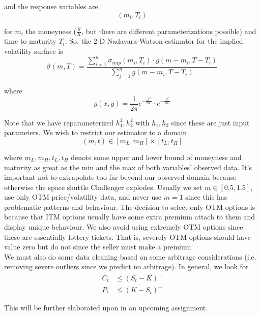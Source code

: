 \documentclass[12pt]{article}
\newlength\tindent
\renewcommand{\indent}{\hspace*{\tindent}}
\begin{document}
and the response variables are
\begin{equation*}
	(m_i,T_i)
\end{equation*}

for $m_i$ the moneyness ($\frac{S}{K}$, but there are different parameterizations possible) and time to maturity $T_i$. So, the 2-D Nadayara-Watson estimator for the implied volatility surface is
\begin{equation*}
	\hat{\sigma}(m,T) = \frac{\sum_{i=1}^n\sigma_{imp}(m_i,T_i)\cdot g(m - m_i, T - T_i)}{\sum_{j = 1}^n g(m - m_i, T - T_i)}
\end{equation*}

where 
\begin{equation*}
	g(x,y) = \frac{1}{2\pi}e^{-\frac{x^2}{2h_1}}\cdot e^{-\frac{y^2}{2h_2}}
\end{equation*}

\indent Note that we have reparameterized $h_1^2, h_2^2$ with $h_1, h_2$ since these are just input parameters. We wish to restrict our estimator to a domain
\begin{equation*}
	(m,t) \in [m_L,m_H]\times[t_L,t_H]
\end{equation*}

where $m_L,m_H,t_L,t_H$ denote some upper and lower bound of moneyness and maturity as great as the min and the max of both variables' observed data. It's important not to extrapolate too far beyond our observed domain because otherwise the space shuttle Challenger explodes. Usually we set $m \in [0.5,1.5]$, use only OTM price/volatility data, and never use $m = 1$ since this has problematic patterns and behaviour. The decision to select only OTM options is because that ITM options usually have some extra premium attach to them and display unique behaviour. We also avoid using extremely OTM options since these are essentially lottery tickets. That is, severely OTM options should have value zero but do not since the seller must make a premium. \\

\indent We must also do some data cleaning based on some arbitrage considerations (i.e. removing severe outliers since we predict no arbitrage). In general, we look for
\begin{align*}
	C_t &\leq (S_t - K)^+ \\
	P_t &\leq (K - S_t)^+
\end{align*}

This will be further elaborated upon in an upcoming assignment.
\end{document}
